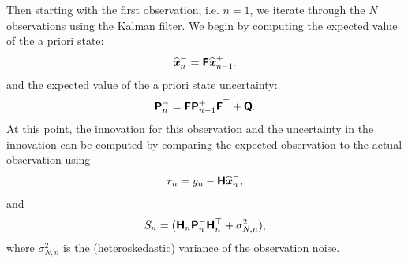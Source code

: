 \documentclass[a4paper,fleqn,usenatbib]{mnras}
\begin{document}
Then starting with the first observation, i.e. $n = 1$, we iterate through the $N$ observations using the Kalman filter. We begin by computing the expected value of the a priori state:
\begin{equation}\label{eq:APrioriState}
\widehat{\textbf{\textit{x}}}^{-}_{n} = \textbf{\textsf{F}} \widehat{\textbf{\textit{x}}}^{+}_{n-1}.
\end{equation}
and the expected value of the a priori state uncertainty:
\begin{equation}\label{eq:APrioriUncertainty}
\textbf{\textsf{P}}^{-}_{n} = \textbf{\textsf{F}} \textbf{\textsf{P}}^{+}_{n-1} \textbf{\textsf{F}}^{\top} + \textbf{\textsf{Q}}.
\end{equation}
At this point, the innovation for this observation and the uncertainty in the innovation can be computed by comparing the expected observation to the actual observation using 
\begin{equation}\label{eq:Innovation}
r_{n} = y_{n} - \textbf{\textsf{H}}\widehat{\textbf{\textit{x}}}^{-}_{n},
\end{equation}
and
\begin{equation}\label{eq:InnovationVar}
S_{n} = ( \textbf{\textsf{H}}_{n} \textbf{\textsf{P}}^{-}_{n} \textbf{\textsf{H}}_{n}^{\top} + \sigma^{2}_{N,n}),
\end{equation}
where $\sigma^{2}_{N,n}$ is the (heteroskedastic) variance of the observation noise. 
\end{document}
